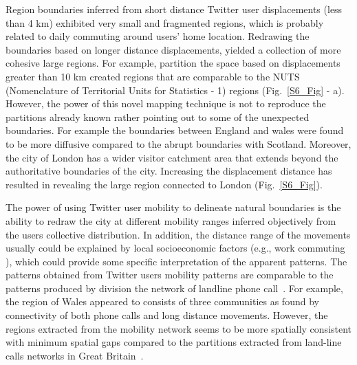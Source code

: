 \documentclass[10pt,letterpaper]{article}
\begin{document}
Region boundaries inferred from short distance Twitter user displacements (less than 4 km) exhibited very small and fragmented regions, which is probably related to daily commuting around users’ home location. 
Redrawing the boundaries based on longer distance displacements, yielded a collection of more cohesive large regions.
For example, partition the space based on displacements greater than 10 km created regions that are comparable to the NUTS (Nomenclature of Territorial Units for Statistics - 1) regions (Fig.~\ref{S6_Fig} - a). 
However, the power of this novel mapping technique is not to reproduce the partitions already known rather pointing out to some of the unexpected boundaries.
For example the boundaries between England and wales were found to be more diffusive compared to the abrupt boundaries with Scotland.
Moreover, the city of London has a wider visitor catchment area that extends beyond the authoritative boundaries of the city. 
Increasing the displacement distance has resulted in revealing the large region connected to London (Fig.~\ref{S6_Fig}). 

The power of using Twitter user mobility to delineate natural boundaries is the ability to redraw the city at different mobility ranges inferred objectively from the users collective distribution. 
In addition, the distance range of the movements usually could be explained by local socioeconomic factors (e.g., work commuting ), which could provide some specific interpretation of the apparent patterns.
The patterns obtained from Twitter users mobility patterns are comparable to the patterns produced by division the network of landline phone call~\cite{ratti2010}.
For example, the region of Wales appeared to consists of three communities as found by connectivity of both phone calls and long distance movements. 
However, the regions extracted from the mobility network seems to be more spatially consistent with minimum spatial gaps compared to the partitions extracted from land-line calls networks in Great Britain~\cite{ratti2010}.
\end{document}
